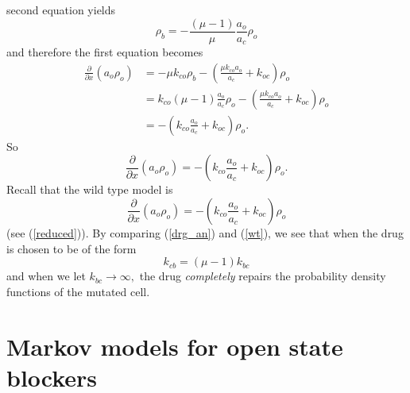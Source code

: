 second equation yields
\begin{equation}
\rho_{b}=-\frac{\left(  \mu-1\right)  }{\mu}\frac{a_{o}}{a_{c}}\rho_{o}
\end{equation}
and therefore the first equation becomes
\begin{align}
\frac{\partial}{\partial x}\left(  a_{o}\rho_{o}\right)   &  =-\mu k_{co}
\rho_{b}-\left(  \frac{\mu k_{co}a_{o}}{a_{c}}+k_{oc}\right)  \rho_{o}\\
&  =k_{co}\left(  \mu-1\right)  \frac{a_{o}}{a_{c}}\rho_{o}-\left(  \frac{\mu
k_{co}a_{o}}{a_{c}}+k_{oc}\right)  \rho_{o}\\
&  =-\left(  k_{co}\frac{a_{o}}{a_{c}}+k_{oc}\right)  \rho_{o}.
\end{align}
So
\begin{equation}
\frac{\partial}{\partial x}\left(  a_{o}\rho_{o}\right)  =-\left(  k_{co}
\frac{a_{o}}{a_{c}}+k_{oc}\right)  \rho_{o}. \label{drg_an}
\end{equation}
Recall that the wild type model is
 \begin{equation}
\frac{\partial}{\partial x}\left(  a_{o}\rho_{o}\right)  =-\left(  
k_{co}\frac{a_{o}}{a_{c}}+k_{oc}\right)  \rho_{o} \label{wt}
\end{equation}
(see (\ref{reduced})). By comparing (\ref{drg_an}) and (\ref{wt}), we see that when the drug is chosen to
be of the form
\[
k_{cb}=\left(  \mu-1\right)  k_{bc}
\]
and when we let $k_{bc}\rightarrow\infty,$ the drug {\it completely} repairs the
probability density functions of the mutated cell.


\section{Markov models for open state blockers}

